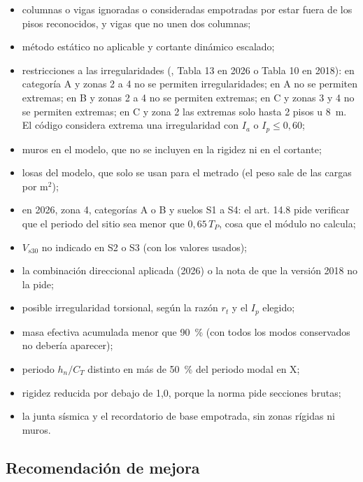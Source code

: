 \begin{itemize}
	\item columnas o vigas ignoradas o consideradas empotradas por estar fuera de los pisos reconocidos, y vigas que no
	      unen dos columnas;
	\item método estático no aplicable y cortante dinámico escalado;
	\item restricciones a las irregularidades (, Tabla 13 en 2026 o Tabla 10 en 2018): en
	      categoría A y zonas 2 a 4 no se permiten irregularidades; en A no se permiten extremas; en B y zonas 2 a 4 no se
	      permiten extremas; en C y zonas 3 y 4 no se permiten extremas; en C y zona 2 las extremas solo hasta 2 pisos u
	      8~m. El código considera extrema una irregularidad con $I_a$ o $I_p \le 0{,}60$;
	\item muros en el modelo, que no se incluyen en la rigidez ni en el cortante;
	\item losas del modelo, que solo se usan para el metrado (el peso sale de las cargas por m$^2$);
	\item en 2026, zona 4, categorías A o B y suelos S1 a S4: el art. 14.8 pide verificar que el periodo del sitio sea
	      menor que $0{,}65\,T_P$, cosa que el módulo no calcula;
	\item $V_{s30}$ no indicado en S2 o S3 (con los valores usados);
	\item la combinación direccional aplicada (2026) o la nota de que la versión 2018 no la pide;
	\item posible irregularidad torsional, según la razón $r_t$ y el $I_p$ elegido;
	\item masa efectiva acumulada menor que 90~\% (con todos los modos conservados no debería aparecer);
	\item periodo $h_n/C_T$ distinto en más de 50~\% del periodo modal en X;
	\item rigidez reducida por debajo de 1,0, porque la norma pide secciones brutas;
	\item la junta sísmica y el recordatorio de base empotrada, sin zonas rígidas ni muros.
\end{itemize}

\subsection{Recomendación de mejora}
\label{sec:sis-recomendacion}

